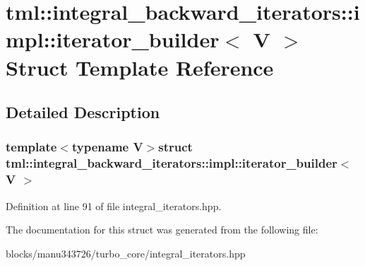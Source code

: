 \hypertarget{structtml_1_1integral__backward__iterators_1_1impl_1_1iterator__builder}{\section{tml\+:\+:integral\+\_\+backward\+\_\+iterators\+:\+:impl\+:\+:iterator\+\_\+builder$<$ V $>$ Struct Template Reference}
\label{structtml_1_1integral__backward__iterators_1_1impl_1_1iterator__builder}
}


\subsection{Detailed Description}
\subsubsection*{template$<$typename V$>$struct tml\+::integral\+\_\+backward\+\_\+iterators\+::impl\+::iterator\+\_\+builder$<$ V $>$}



Definition at line 91 of file integral\+\_\+iterators.\+hpp.



The documentation for this struct was generated from the following file\+:\begin{DoxyCompactItemize}
\item 
blocks/manu343726/turbo\+\_\+core/integral\+\_\+iterators.\+hpp\end{DoxyCompactItemize}
